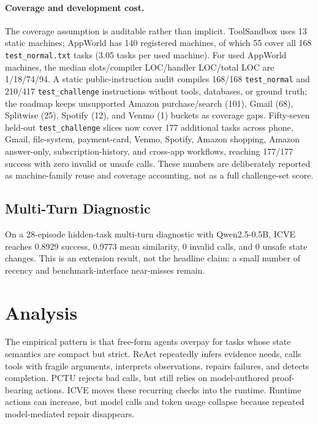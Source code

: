 \documentclass[11pt]{article}
\begin{document}
\paragraph{Coverage and development cost.}
The coverage assumption is auditable rather than implicit. ToolSandbox uses 13 static
machines; AppWorld has 140 registered machines, of which 55 cover all 168
\texttt{test\_normal.txt} tasks (3.05 tasks per used machine). For used AppWorld
machines, the median slots/compiler LOC/handler LOC/total LOC are 1/18/74/94. A static
public-instruction audit compiles 168/168 \texttt{test\_normal} and 210/417
\texttt{test\_challenge} instructions without tools, databases, or ground truth; the
roadmap keeps unsupported Amazon purchase/search (101), Gmail (68), Splitwise (25), Spotify (12), and Venmo (1)
buckets as coverage gaps. Fifty-seven held-out \texttt{test\_challenge} slices now cover
177 additional tasks across phone, Gmail, file-system, payment-card, Venmo, Spotify, Amazon
shopping, Amazon answer-only, subscription-history, and cross-app workflows, reaching
177/177 success with zero invalid or unsafe calls. These numbers are deliberately reported as
machine-family reuse and coverage accounting, not as a full challenge-set score.

\subsection{Multi-Turn Diagnostic}

On a 28-episode hidden-task multi-turn diagnostic with Qwen2.5-0.5B, ICVE reaches
0.8929 success, 0.9773 mean similarity, 0 invalid calls, and 0 unsafe state changes.
This is an extension result, not the headline claim: a small number of recency and
benchmark-interface near-misses remain.

\section{Analysis}

The empirical pattern is that free-form agents overpay for tasks whose state semantics
are compact but strict. ReAct repeatedly infers evidence needs, calls tools with fragile
arguments, interprets observations, repairs failures, and detects completion. PCTU
rejects bad calls, but still relies on model-authored proof-bearing actions. ICVE moves
these recurring checks into the runtime. Runtime actions can increase, but model calls
and token usage collapse because repeated model-mediated repair disappears.
\end{document}
